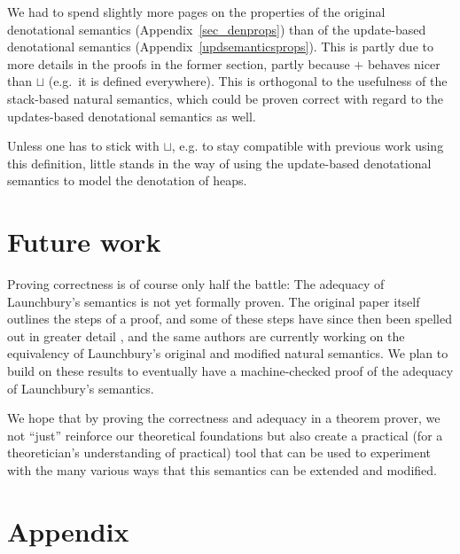 \documentclass{jfp1}
\theoremstyle{nonumberbreak}
\begin{document}
We had to spend slightly more pages on the properties of the original denotational semantics (Appendix~\ref{sec_denprops}) than of the update-based denotational semantics (Appendix~\ref{updsemanticsprops}). This is partly due to more details in the proofs in the former section, partly because $+$ behaves nicer than $\sqcup$ (e.g.\ it is defined everywhere). This is orthogonal to the usefulness of the stack-based natural semantics, which could be proven correct with regard to the updates-based denotational semantics as well.

Unless one has to stick with $\sqcup$, e.g. to stay compatible with previous work using this definition, little stands in the way of using the update-based denotational semantics to model the denotation of heaps.

\section{Future work}

Proving correctness is of course only half the battle: The adequacy of Launchbury’s semantics is not yet formally proven. The original paper itself outlines the steps of a proof, and some of these steps have since then been spelled out in greater detail \cite{functionspaces}, and the same authors are currently working on the equivalency of Launchbury’s original and modified natural semantics. We plan to build on these results to eventually have a machine-checked proof of the adequacy of Launchbury’s semantics.

We hope that by proving the correctness and adequacy in a theorem prover, we not “just” reinforce our theoretical foundations but also create a practical (for a theoretician’s understanding of practical) tool that can be used to experiment with the many various ways that this semantics can be extended and modified.






\appendix

\section{Appendix}
\end{document}
